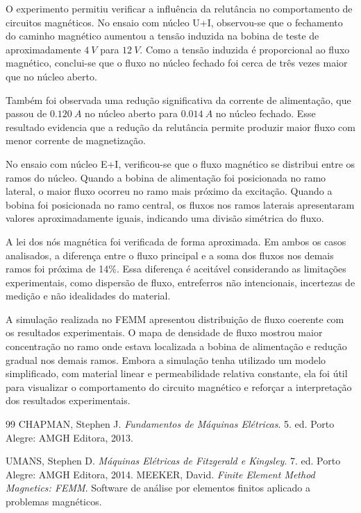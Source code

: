 \documentclass[11pt,a4paper]{article}
\begin{document}
O experimento permitiu verificar a influência da relutância no comportamento de circuitos magnéticos. No ensaio com núcleo U+I, observou-se que o fechamento do caminho magnético aumentou a tensão induzida na bobina de teste de aproximadamente \(\SI{4}{V}\) para \(\SI{12}{V}\). Como a tensão induzida é proporcional ao fluxo magnético, conclui-se que o fluxo no núcleo fechado foi cerca de três vezes maior que no núcleo aberto.

Também foi observada uma redução significativa da corrente de alimentação, que passou de \(\SI{0,120}{A}\) no núcleo aberto para \(\SI{0,014}{A}\) no núcleo fechado. Esse resultado evidencia que a redução da relutância permite produzir maior fluxo com menor corrente de magnetização.

No ensaio com núcleo E+I, verificou-se que o fluxo magnético se distribui entre os ramos do núcleo. Quando a bobina de alimentação foi posicionada no ramo lateral, o maior fluxo ocorreu no ramo mais próximo da excitação. Quando a bobina foi posicionada no ramo central, os fluxos nos ramos laterais apresentaram valores aproximadamente iguais, indicando uma divisão simétrica do fluxo.

A lei dos nós magnética foi verificada de forma aproximada. Em ambos os casos analisados, a diferença entre o fluxo principal e a soma dos fluxos nos demais ramos foi próxima de 14\%. Essa diferença é aceitável considerando as limitações experimentais, como dispersão de fluxo, entreferros não intencionais, incertezas de medição e não idealidades do material.

A simulação realizada no FEMM apresentou distribuição de fluxo coerente com os resultados experimentais. O mapa de densidade de fluxo mostrou maior concentração no ramo onde estava localizada a bobina de alimentação e redução gradual nos demais ramos. Embora a simulação tenha utilizado um modelo simplificado, com material linear e permeabilidade relativa constante, ela foi útil para visualizar o comportamento do circuito magnético e reforçar a interpretação dos resultados experimentais.


\begin{thebibliography}{99} 
    CHAPMAN, Stephen J. 
    \textit{Fundamentos de Máquinas Elétricas}. 
    5. ed. 
    Porto Alegre: AMGH Editora, 2013. 
    
    UMANS, Stephen D. 
    \textit{Máquinas Elétricas de Fitzgerald e Kingsley}. 
    7. ed. 
    Porto Alegre: AMGH Editora, 2014.
     MEEKER, David. 
    \textit{Finite Element Method Magnetics: FEMM}. 
    Software de análise por elementos finitos aplicado a problemas magnéticos. 
    
\end{thebibliography} 
    
\end{document}

